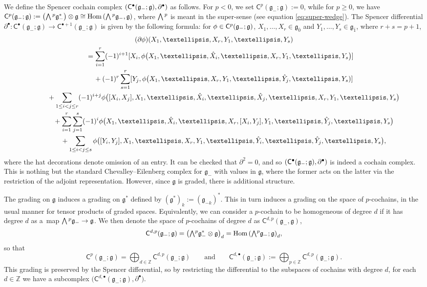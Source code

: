 \documentclass[11pt]{article}
\numberwithin{equation}{section}
\numberwithin{equation}{section}
\newcommand{\fg}{\mathfrak{g}}
\newcommand{\ZZ}{\mathbb{Z}}
\newcommand{\ssC}{\mathsf{C}}
\newcommand{\Wedge}{\mathchoice{{\textstyle\bigwedge}}{\bigwedge}{\bigwedge}{\bigwedge}}	%
\newcommand{\1}{\mathbbm{1}}
\DeclareMathOperator{\Hom}{Hom}
\begin{document}
We define the Spencer cochain complex $\qty(\ssC^\bullet(\fg_-;\fg),\partial^\bullet)$ as follows. For $p<0$, we set $\ssC^p(\fg_-;\fg)\allowbreak:=0$, while for $p\geq 0$, we have
$\ssC^p(\fg_-;\fg) := \qty(\Wedge^p \fg_-^*) \otimes \fg \cong \Hom\qty(\Wedge^p \fg_-,\fg)$,
where $\Wedge^p$ is meant in the super-sense (see equation \eqref{eq:super-wedge}). The Spencer differential $\partial^\bullet\colon \ssC^\bullet(\fg_-;\fg)\to \ssC^{\bullet+1}(\fg_-;\fg)$ is given by the following formula: for $\phi\in \ssC^p\qty(\fg_-;\fg)$, $X_1,\dots, X_r\in\fg_{\overline{0}}$ and $Y_1,\dots,Y_s\in\fg_{\overline{1}}$, where $r+s=p+1$,
\begin{gather}
	(\partial\phi)\qty(X_1,\dots,X_r,Y_1,\dots,Y_s)\nonumber\\
\qquad	= \sum_{i=1}^r (-1)^{i+1} [X_i,\phi\bigl(X_1,\dots,\hat{X}_i,\dots,X_r,Y_1,\dots,Y_s\bigr)]	\nonumber\\
\phantom{\qquad=}{}+ (-1)^{r} \sum_{s=1}^r [Y_j,\phi \bigl(X_1,\dots,X_r,Y_1,\dots,\hat{Y}_j,\dots,Y_s)]\nonumber	\\
\phantom{\qquad=}{}+ \sum_{1\leq i<j\leq r} (-1)^{i+j} \phi \bigl(\comm{X_i}{X_j},X_1,\dots,\hat{X}_i,\dots,\hat{X}_j,\dots,X_r,Y_1,\dots,Y_s\bigr)\nonumber	\\
\phantom{\qquad=}{}+ \sum_{i=1}^r\sum_{j=1}^s (-1)^{i} \phi \bigl(X_1,\dots,\hat{X}_i,\dots,X_r,\comm{X_i}{Y_j},Y_1,\dots,\hat{Y}_j,\dots,Y_s\bigr)	\nonumber\\
\phantom{\qquad=}{}+ \sum_{1\leq i<j\leq s} \phi \bigl(\comm{Y_i}{Y_j},X_1,\dots,X_r,Y_1,\dots,\hat{Y}_i,\dots,\hat{Y}_j,\dots,Y_s\bigr),\label{eq:CEdiffLiesuper}
\end{gather}
where the hat decorations denote omission of an entry. It can be checked that $\partial^2=0$, and so $\qty(\ssC^\bullet(\fg_-;\fg),\partial^\bullet)$ is indeed a cochain complex. This is nothing but the standard Chevalley--Eilenberg complex for $\fg_-$ with values in $\fg$, where the former acts on the latter via the restriction of the adjoint representation. However, since $\fg$ is graded, there is additional structure.

The grading on $\fg$ induces a grading on $\fg^*$ defined by $(\fg^*)_k:=(\fg_{-k})^*$. This in turn induces a grading on the space of $p$-cochains, in the usual manner for tensor products of graded spaces. Equivalently, we can consider a $p$-cochain to be homogeneous of degree $d$ if it has degree $d$ as a~map $\Wedge^p \fg_-\to\fg$. We then denote the space of $p$-cochains of degree $d$ as $\ssC^{d,p}(\fg_-,\fg)$,
\begin{equation}\label{eq:spencer-complex-grading}
	\ssC^{d,p}(\fg_-;\fg) = \qty(\Wedge^p \fg_-^*\otimes \fg)_d = \Hom\qty(\Wedge^p \fg_-;\fg)_d,
\end{equation}
so that
\[
	\ssC^p(\fg_-;\fg) = \bigoplus_{d\in\ZZ} \ssC^{d,p}(\fg_-;\fg) \qquad\text{and} \qquad\ssC^{d,\bullet}(\fg_-;\fg) := \bigoplus_{p\in\ZZ} \ssC^{d,p}(\fg_-;\fg).
\]
This grading is preserved by the Spencer differential, so by restricting the differential to the subspaces of cochains with degree $d$, for each $d\in\ZZ$ we have a subcomplex $\bigl(\ssC^{d,\bullet}(\fg_-;\fg),\partial^\bullet\bigr)$.
\end{document}

